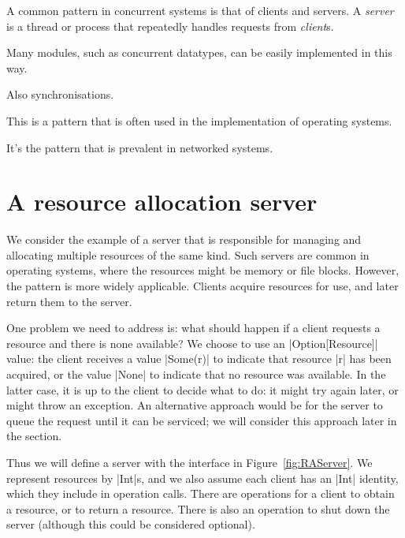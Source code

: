 A common pattern in concurrent systems is that of clients and servers.  A
\emph{server} is a thread or process that repeatedly handles requests from
\emph{client}s.

Many modules, such as concurrent datatypes, can be easily implemented in
this way.

Also synchronisations.

This is a pattern that is often used in the implementation of operating
systems.

It's the pattern that is prevalent in networked systems.



\section{A resource allocation server}

We consider the example of a server that is responsible for managing and
allocating multiple resources of the same kind.  Such servers are common in
operating systems, where the resources might be memory or file blocks.
However, the pattern is more widely applicable.  Clients acquire resources for
use, and later return them to the server.

One problem we need to address is: what should happen if a client requests a
resource and there is none available?  We choose to use an |Option[Resource]|
value: the client receives a value |Some(r)| to indicate that resource |r| has
been acquired, or the value |None| to indicate that no resource was available.
%
In the latter case, it is up to the client to decide what to do: it might try
again later, or might throw an exception.  
%
An alternative approach would be for the server to queue the request until it
can be serviced; we will consider this approach later in the section.


Thus we will define a server with the interface in Figure~\ref{fig:RAServer}.
We represent resources by |Int|s, and we also assume each client has an |Int|
identity, which they include in operation calls.  There are operations for a
client to obtain a resource, or to return a resource.  There is also an
operation to shut down the server (although this could be considered
optional). 


